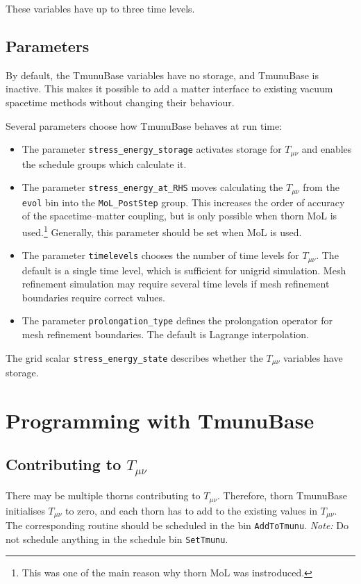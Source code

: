 \documentclass{article}
\begin{document}
These variables have up to three time levels.

\subsection{Parameters}

By default, the TmunuBase variables have no storage, and TmunuBase is
inactive.  This makes it possible to add a matter interface to
existing vacuum spacetime methods without changing their behaviour.

Several parameters choose how TmunuBase behaves at run time:
\begin{itemize}
\item The parameter \texttt{stress\_energy\_storage} activates storage
  for $T_{\mu\nu}$ and enables the schedule groups which calculate it.
\item The parameter \texttt{stress\_energy\_at\_RHS} moves calculating
  the $T_{\mu\nu}$ from the \texttt{evol} bin into the
  \texttt{MoL\_PostStep} group.  This increases the order of accuracy
  of the spacetime--matter coupling, but is only possible when thorn
  MoL is used.\footnote{This was one of the main reason why thorn MoL
    was instroduced.}  Generally, this parameter should be set when
  MoL is used.
\item The parameter \texttt{timelevels} chooses the number of time
  levels for $T_{\mu\nu}$.  The default is a single time level, which
  is sufficient for unigrid simulation.  Mesh refinement simulation
  may require several time levels if mesh refinement boundaries
  require correct values.
\item The parameter \texttt{prolongation\_type} defines the
  prolongation operator for mesh refinement boundaries.  The default
  is Lagrange interpolation.
\end{itemize}

The grid scalar \texttt{stress\_energy\_state} describes whether the
$T_{\mu\nu}$ variables have storage.

\section{Programming with TmunuBase}

\subsection{Contributing to $T_{\mu\nu}$}

There may be multiple thorns contributing to $T_{\mu\nu}$.  Therefore,
thorn TmunuBase initialises $T_{\mu\nu}$ to zero, and each thorn has
to add to the existing values in $T_{\mu\nu}$.  The corresponding
routine should be scheduled in the bin \texttt{AddToTmunu}.
\emph{Note:} Do not schedule anything in the schedule bin
\texttt{SetTmunu}.
\end{document}
